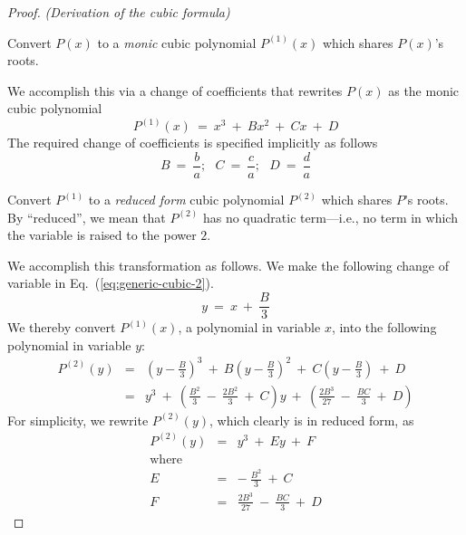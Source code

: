 \begin{proof} {\it (Derivation of the cubic formula)}

\smallskip

 Convert $P(x)$ to a {\em monic} cubic polynomial $P^{(1)}(x)$ which shares $P(x)$'s roots.

\smallskip

\noindent
We accomplish this via a change of coefficients that rewrites $P(x)$ as the monic cubic polynomial
\begin{equation}
\label{eq:generic-cubic-2}
P^{(1)}(x) \ = \  x^3 \ + \ Bx^2 \ + \ Cx \ + \ D
\end{equation}
The required change of coefficients is specified implicitly as follows
\[
B \ = \ \frac{b}{a}; \ \ \
C \ = \ \frac{c}{a}; \ \ \
D \ = \ \frac{d}{a}
\]

\medskip


 Convert $P^{(1)}$ to a {\em reduced form} cubic polynomial $P^{(2)}$ which shares $P$'s roots.  By ``reduced'', we mean that $P^{(2)}$ has no quadratic term---i.e., no term in which the variable is raised to the power $2$.

\smallskip

\noindent
We accomplish this transformation as follows.  We make the following change of variable in Eq.~(\ref{eq:generic-cubic-2}).
\begin{equation}
\label{eq:cubic-substitute-y-for-x} 
y \ = \ x \ + \ \frac{B}{3}
\end{equation}
We thereby convert $P^{(1)}(x)$, a polynomial in variable $x$, into the following polynomial in variable $y$:
\begin{eqnarray}
\nonumber
P^{(2)}(y) & = &  \left(y - \frac{B}{3} \right)^3
 \ + \ B \left(y - \frac{B}{3} \right)^2
 \ + \ C \left(y - \frac{B}{3} \right) \ + \ D \\
\label{eq:generic-cubic-3}
           & = &
y^3 \ + \
\left( \frac{B^2}{3} \ - \ \frac{2B^2}{3} \ + \ C  \right) y
\ + \ \left( \frac{2 B^3}{27}  \ - \ \frac{BC}{3}  \ + \ D \right)
\end{eqnarray}
For simplicity, we rewrite $P^{(2)}(y)$, which clearly is in reduced form, as
\begin{eqnarray}
\label{eq:generic-cubic-4}
P^{(2)}(y) & = & y^3 \ + \ E y \ + \ F \\
\nonumber
\mbox{where} & & \\
\nonumber
E & = & - \ \frac{B^2}{3} \ + \ C \\
\nonumber
F & = & \frac{2 B^3}{27}  \ - \ \frac{BC}{3}  \ + \ D
\end{eqnarray}



\end{proof}
